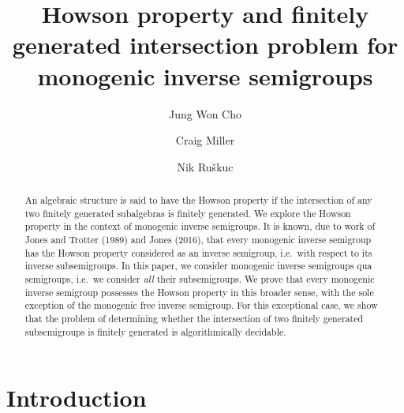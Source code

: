 \documentclass[reqno]{amsart}
\theoremstyle{plain}
\theoremstyle{definition}
\numberwithin{equation}{section}
\begin{document}
	
	
\title[Howson property and finitely generated intersection problem]{Howson property and finitely generated intersection problem for monogenic inverse semigroups}
	
\author{Jung Won Cho}
	
\address{School of Mathematics and Statistics, University of St Andrews, St Andrews, Fife KY16 9SS, UK.}
	
\author{Craig Miller}
\address{Department of Computer Science, Durham University, Stockton Road, Durham, DH1 3LE, UK}
	
	
\author{Nik Ru\v{s}kuc}
\address{School of Mathematics and Statistics, University of St Andrews, St Andrews, Fife KY16 9SS, UK.}
	
	


\begin{abstract}
An algebraic structure is said to have the Howson property if the intersection of any two finitely generated subalgebras is finitely generated. We explore the Howson property in the context of monogenic inverse semigroups. It is known, due to work of Jones and Trotter (1989) and Jones (2016), that every monogenic inverse semigroup has the Howson property considered as an inverse semigroup, i.e.\ with respect to its inverse subsemigroups. In this paper, we consider monogenic inverse semigroups qua semigroups, i.e.\ we consider \emph{all} their subsemigroups. We prove that every monogenic inverse semigroup possesses the Howson property in this broader sense, with the sole exception of the monogenic free inverse semigroup. For this exceptional case, we show that the problem of determining whether the intersection of two finitely generated subsemigroups is finitely generated is algorithmically decidable.
\end{abstract}

\maketitle

\section{Introduction}
\label{sec:Intro}
\end{document}
